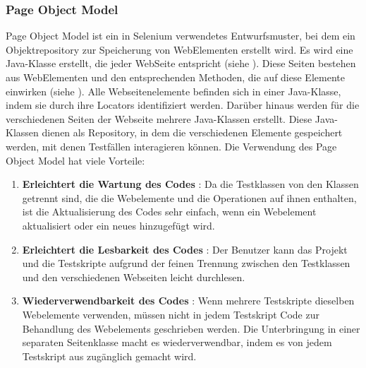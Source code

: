\subsubsection{Page Object Model}

Page Object Model ist ein in Selenium verwendetes Entwurfsmuster,
bei dem ein Objektrepository zur Speicherung von WebElementen
erstellt wird. Es wird eine Java-Klasse erstellt, die jeder WebSeite
entspricht (siehe ). Diese Seiten bestehen aus WebElementen und den
entsprechenden Methoden, die auf diese Elemente einwirken (siehe ).
Alle Webseitenelemente befinden sich in einer Java-Klasse, indem sie durch
ihre Locators identifiziert werden.  Darüber hinaus werden für die
verschiedenen Seiten der Webseite mehrere Java-Klassen erstellt. Diese
Java-Klassen dienen als Repository, in dem die verschiedenen Elemente
gespeichert werden, mit denen Testfällen interagieren können. Die Verwendung
des Page Object Model hat viele Vorteile:

\begin{enumerate}
    \item \textbf{Erleichtert die Wartung des Codes} : Da die Testklassen von den
    Klassen getrennt sind, die die Webelemente und die Operationen auf
    ihnen enthalten, ist die Aktualisierung des Codes sehr einfach, wenn
    ein Webelement aktualisiert oder ein neues hinzugefügt wird.
    \item \textbf{Erleichtert die Lesbarkeit des Codes} : Der Benutzer kann das Projekt
    und die Testskripte aufgrund der feinen Trennung zwischen den Testklassen
    und den verschiedenen Webseiten leicht durchlesen.
    \item \textbf{Wiederverwendbarkeit des Codes} : Wenn mehrere Testskripte dieselben
    Webelemente verwenden, müssen nicht in jedem Testskript Code zur
    Behandlung des Webelements geschrieben werden. Die Unterbringung in einer
    separaten Seitenklasse macht es wiederverwendbar, indem es von jedem
    Testskript aus zugänglich gemacht wird.
\end{enumerate}

